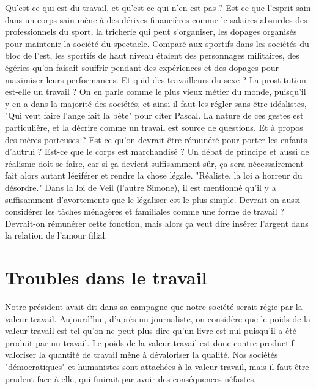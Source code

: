 \documentclass[a4paper,12pt]{book}
\begin{document}
\par Qu'est-ce qui est du travail, et qu'est-ce qui n'en est pas ? Est-ce que l'esprit sain dans un corps sain mène à des dérives financières comme le salaires absurdes des professionnels du sport, la tricherie qui peut s'organiser, les dopages organisés pour maintenir la société du spectacle. Comparé aux sportifs dans les sociétés du bloc de l'est, les sportifs de haut niveau étaient des personnages militaires, des égéries qu'on faisait souffrir pendant des expériences et des dopages pour maximiser leurs performances. Et quid des travailleurs du sexe ? La prostitution est-elle un travail ? On en parle comme le plus vieux métier du monde, puisqu'il y en a dans la majorité des sociétés, et ainsi il faut les régler sans être idéalistes, "Qui veut faire l'ange fait la bête" pour citer Pascal. La nature de ces gestes est particulière, et la décrire comme un travail est source de questions. Et à propos des mères porteuses ? Est-ce qu'on devrait être rémunéré pour porter les enfants d'autrui ? Est-ce que le corps est marchandisé ? Un débat de principe et aussi de réalisme doit se faire, car si ça devient suffisamment sûr, ça sera nécessairement fait alors autant légiférer et rendre la chose légale. "Réaliste, la loi a horreur du désordre." Dans la loi de Veil (l'autre Simone), il est mentionné qu'il y a suffisamment d'avortements que le légaliser est le plus simple. Devrait-on aussi considérer les tâches ménagères et familiales comme une forme de travail ? Devrait-on rémunérer cette fonction, mais alors ça veut dire insérer l'argent dans la relation de l'amour filial.

\section{Troubles dans le travail}
Notre président avait dit dans sa campagne que notre société serait régie par la valeur travail. Aujourd'hui, d'après un journaliste, on considère que le poids de la valeur travail est tel qu'on ne peut plus dire qu'un livre est nul puisqu'il a été produit par un travail. Le poids de la valeur travail est donc contre-productif : valoriser la quantité de travail mène à dévaloriser la qualité. Nos sociétés "démocratiques" et humanistes sont attachées à la valeur travail,  mais il faut être prudent face à elle, qui finirait par avoir des conséquences néfastes. 
\end{document}
